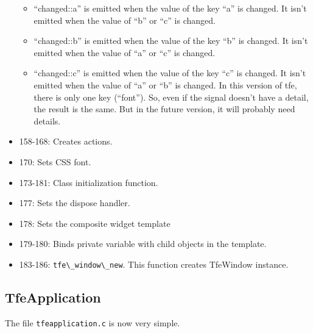 \begin{itemize}
  \begin{itemize}
  \tightlist
  \item
    ``changed::a'' is emitted when the value of the key ``a'' is
    changed. It isn't emitted when the value of ``b'' or ``c'' is
    changed.
  \item
    ``changed::b'' is emitted when the value of the key ``b'' is
    changed. It isn't emitted when the value of ``a'' or ``c'' is
    changed.
  \item
    ``changed::c'' is emitted when the value of the key ``c'' is
    changed. It isn't emitted when the value of ``a'' or ``b'' is
    changed. In this version of tfe, there is only one key (``font'').
    So, even if the signal doesn't have a detail, the result is the
    same. But in the future version, it will probably need details.
  \end{itemize}
\item
  158-168: Creates actions.
\item
  170: Sets CSS font.
\item
  173-181: Class initialization function.
\item
  177: Sets the dispose handler.
\item
  178: Sets the composite widget template
\item
  179-180: Binds private variable with child objects in the template.
\item
  183-186: \passthrough{\lstinline!tfe\_window\_new!}. This function
  creates TfeWindow instance.
\end{itemize}

\hypertarget{tfeapplication}{%
\subsection{TfeApplication}\label{tfeapplication}}

The file \passthrough{\lstinline!tfeapplication.c!} is now very simple.

